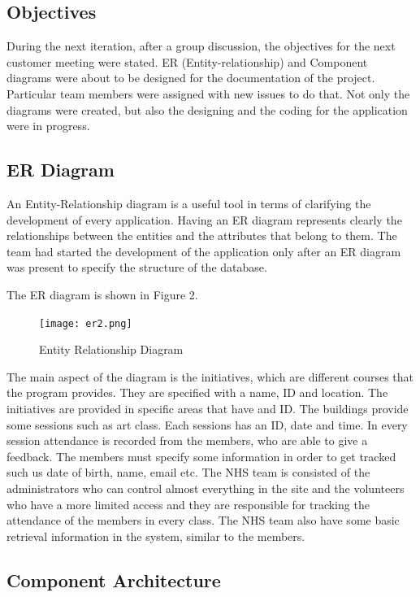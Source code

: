 \documentclass{l3proj}
\begin{document}
\subsection{Objectives}
\label{sec:objectives}

During the next iteration, after a group discussion, the objectives for the next customer meeting were stated. ER (Entity-relationship) and Component diagrams were about to be designed for the documentation of the project. Particular team members were assigned with new issues to do that. Not only the diagrams were created, but also the designing and the coding for the application were in progress. 

\subsection{ER Diagram}
\label{sec:er}

An Entity-Relationship diagram \cite{er} is a useful tool in terms of clarifying the development of every application. Having an ER diagram represents clearly the relationships between the entities and the attributes that belong to them. The team had started the development of the application only after an ER diagram was present to specify the structure of the database.

The ER diagram is shown in Figure 2.

\begin{figure}
\centerline{\texttt{[image: er2.png]}}
\caption{Entity Relationship Diagram}
\label{fig:er}
\end{figure}

The main aspect of the diagram is the initiatives, which are different courses that the program provides. They are specified with a name, ID and location. The initiatives are provided in specific areas that have and ID. The buildings provide some sessions such as art class. Each sessions has an ID, date and time. In every session attendance is recorded from the members, who are able to give a feedback. The members must specify some information in order to get tracked such us date of birth, name, email etc. The NHS team is consisted of the administrators who can control almost everything in the site and the volunteers who have a more limited access and they are responsible for tracking the attendance of the members in every class. The NHS team also have some basic retrieval information in the system, similar to the members.

\subsection{Component Architecture}
\label{sec:component}
\end{document}
